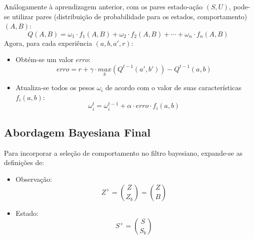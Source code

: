 \documentclass{beamer}
\begin{document}

\begin{frame}
Análogamente à aprendizagem anterior, com os pares estado-ação $ \left( S, U \right) $, pode-se utilizar pares (distribuição de probabilidade para os estados, comportamento) $ \left( A, B \right) $:
$$ Q \left( A, B \right) = \omega_1 \cdot f_1 \left( A, B \right) + \omega_2 \cdot f_2 \left( A, B \right) + \cdots + \omega_n \cdot f_n \left( A, B \right) $$\pause
Agora, para cada experiência $ \left( a, b, a', r \right) $:\pause
\begin{itemize}
	\item Obtém-se um valor $ erro $:
		$$ erro = r + \gamma \cdot \underset{b}{max} \left( Q^{t-1} \left( a', b' \right) \right) - Q^{t-1} \left( a, b \right) $$\pause
	\item Atualiza-se todos os pesos $ \omega_i $ de acordo com o valor de suas características $ f_i \left( a, b \right) $:
		$$ \omega_i^t = \omega_i^{t-1} + \alpha \cdot erro \cdot f_i \left( a, b \right) $$
\end{itemize}
\end{frame}


\subsection{Abordagem Bayesiana Final}

\begin{frame}
Para incorporar a seleção de comportamento no filtro bayesiano, expande-se as definições de:\pause
\begin{itemize}
	\item Observação: $$ Z^+ = \binom{Z}{Z_b} = \binom{Z}{B} $$\pause
	\item Estado: $$ S^+ = \binom{S}{S_b} $$
\end{itemize}
\end{frame}

\end{document}
